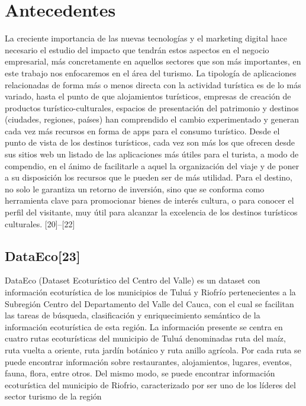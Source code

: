 \documentclass[12pt,letterpaper,openany]{book}
\begin{document}
\section{Antecedentes}
La creciente importancia de las nuevas tecnologías y el marketing digital hace necesario el estudio del impacto que tendrán estos aspectos en el negocio empresarial, más concretamente en aquellos sectores que son más importantes, en este trabajo nos enfocaremos en el área del turismo.
La tipología de aplicaciones relacionadas de forma más o menos directa con la actividad turística es de lo más variado, hasta el punto de que alojamientos turísticos, empresas de creación de productos turístico-culturales, espacios de presentación del patrimonio y destinos (ciudades, regiones, países) han comprendido el cambio experimentado y generan cada vez más recursos en forma de apps para el consumo turístico. 
Desde el punto de vista de los destinos turísticos, cada vez son más los que ofrecen desde sus sitios web un listado de las aplicaciones más útiles para el turista, a modo de compendio, en el ánimo de facilitarle a aquel la organización del viaje y de poner a su disposición los recursos que le pueden ser de más utilidad.
Para el destino, no solo le garantiza un retorno de inversión, sino que se conforma como herramienta clave para promocionar bienes de interés cultura, o para conocer el perfil del visitante, muy útil para alcanzar la excelencia de los destinos turísticos culturales. [20]–[22]

\subsection{DataEco[23]}
DataEco (Dataset Ecoturístico del Centro del Valle) es un dataset con información ecoturística de los municipios de Tuluá y Riofrío pertenecientes a la Subregión Centro del Departamento del Valle del Cauca, con el cual se facilitan las tareas de búsqueda, clasificación y enriquecimiento semántico de la información ecoturística de esta región.
La información presente se centra en cuatro rutas ecoturísticas del municipio de Tuluá denominadas ruta del maíz, ruta vuelta a oriente, ruta jardín botánico y ruta anillo agrícola. Por cada ruta se puede encontrar información sobre restaurantes, alojamientos, lugares, eventos, fauna, flora, entre otros.
Del mismo modo, se puede encontrar información ecoturística del municipio de Riofrio, caracterizado por ser uno de los líderes del sector turismo de la región
\end{document}
